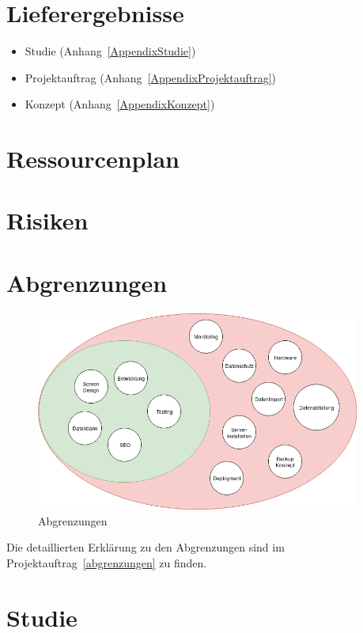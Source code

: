 \section{Lieferergebnisse}

\begin{itemize}
  \tightlist
  \item
    Studie (Anhang~\ref{AppendixStudie})
  \item
    Projektauftrag (Anhang~\ref{AppendixProjektauftrag})
  \item
    Konzept (Anhang~\ref{AppendixKonzept})
\end{itemize}

\section{Ressourcenplan}

\section{Risiken}

\clearpage

\section{Abgrenzungen}

\begin{figure}[!htb]
  \centering
  \includegraphics[width=0.95\textwidth]{figures/abgrenzungen.png}
  \caption{Abgrenzungen}
\end{figure}

Die detaillierten Erklärung zu den Abgrenzungen sind im Projektauftrag~\ref{abgrenzungen} zu finden.

\clearpage

\section{Studie}

